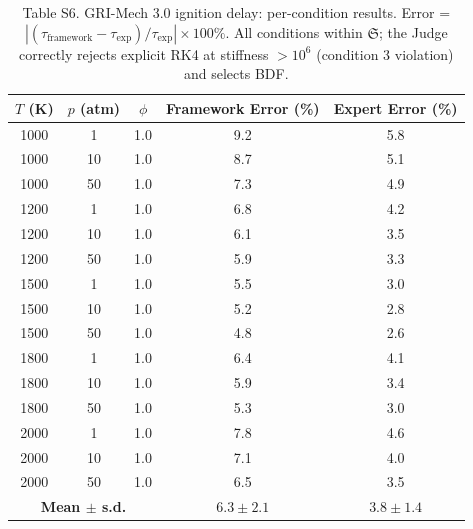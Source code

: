 \documentclass[11pt,a4paper]{article}
\newcommand{\Sclass}{\mathfrak{S}}
\begin{document}
\begin{table}[htbp]
\centering
\caption{Table S6. GRI-Mech 3.0 ignition delay: per-condition results. Error = $|(\tau_{\text{framework}} - \tau_{\text{exp}}) / \tau_{\text{exp}}| \times 100\%$. All conditions within $\Sclass$; the Judge correctly rejects explicit RK4 at stiffness $> 10^6$ (condition 3 violation) and selects BDF.}
\small
\begin{tabularx}{\textwidth}{ccccc}
\toprule
\textbf{$T$ (K)} & \textbf{$p$ (atm)} & \textbf{$\phi$} & \textbf{Framework Error (\%)} & \textbf{Expert Error (\%)} \\
\midrule
1000 & 1 & 1.0 & 9.2 & 5.8 \\
1000 & 10 & 1.0 & 8.7 & 5.1 \\
1000 & 50 & 1.0 & 7.3 & 4.9 \\
1200 & 1 & 1.0 & 6.8 & 4.2 \\
1200 & 10 & 1.0 & 6.1 & 3.5 \\
1200 & 50 & 1.0 & 5.9 & 3.3 \\
1500 & 1 & 1.0 & 5.5 & 3.0 \\
1500 & 10 & 1.0 & 5.2 & 2.8 \\
1500 & 50 & 1.0 & 4.8 & 2.6 \\
1800 & 1 & 1.0 & 6.4 & 4.1 \\
1800 & 10 & 1.0 & 5.9 & 3.4 \\
1800 & 50 & 1.0 & 5.3 & 3.0 \\
2000 & 1 & 1.0 & 7.8 & 4.6 \\
2000 & 10 & 1.0 & 7.1 & 4.0 \\
2000 & 50 & 1.0 & 6.5 & 3.5 \\
\midrule
\multicolumn{3}{c}{\textbf{Mean $\pm$ s.d.}} & $6.3 \pm 2.1$ & $3.8 \pm 1.4$ \\
\bottomrule
\end{tabularx}
\end{table}
\end{document}
